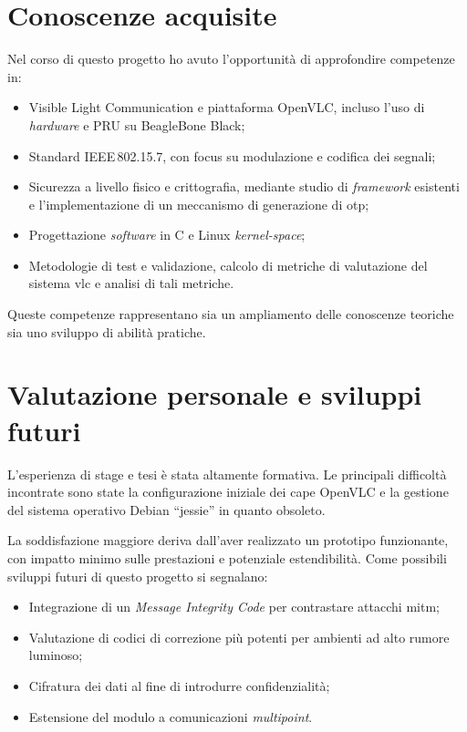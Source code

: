 \section{Conoscenze acquisite}
Nel corso di questo progetto ho avuto l'opportunità di approfondire competenze in:
\begin{itemize}
  \item Visible Light Communication e piattaforma OpenVLC, incluso l'uso di \textit{hardware} e PRU su BeagleBone Black;
  \item Standard IEEE\,802.15.7, con focus su modulazione e codifica dei segnali;
  \item Sicurezza a livello fisico e crittografia, mediante studio di \textit{framework} esistenti e l'implementazione di un meccanismo di generazione di \gls{otp};
  \item Progettazione \textit{software} in C e Linux \textit{kernel-space};
  \item Metodologie di test e validazione, calcolo di metriche di valutazione del sistema \gls{vlc} e analisi di tali metriche.
\end{itemize}
Queste competenze rappresentano sia un ampliamento delle conoscenze teoriche sia uno sviluppo di abilità pratiche.

\section{Valutazione personale e sviluppi futuri}
L'esperienza di stage e tesi è stata altamente formativa. Le principali difficoltà incontrate sono state la configurazione iniziale dei cape OpenVLC e la gestione del sistema operativo Debian “jessie” in quanto obsoleto.

La soddisfazione maggiore deriva dall'aver realizzato un prototipo funzionante, con impatto minimo sulle prestazioni e potenziale estendibilità. Come possibili sviluppi futuri di questo progetto si segnalano:
\begin{itemize}
  \item Integrazione di un \textit{Message Integrity Code} per contrastare attacchi \gls{mitm};
  \item Valutazione di codici di correzione più potenti per ambienti ad alto rumore luminoso;
  \item Cifratura dei dati al fine di introdurre confidenzialità;
  \item Estensione del modulo a comunicazioni \textit{multipoint}.
\end{itemize}